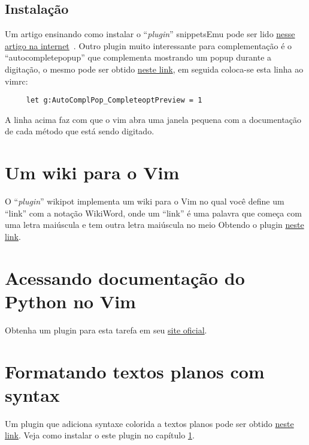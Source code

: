 \subsection{Instalação}
\label{Instalação}

Um artigo ensinando como instalar o ``{\em plugin}'' snippetsEmu pode ser lido 
\href{http://vivaotux.blogspot.com/2008/03/instalando-o-plugin-snippetsemu-no-vim.html}{nesse artigo na internet}~\cite{SilvasnipptsEmu}.
Outro plugin muito interessante para complementação é o ``autocompletepopup'' que complementa 
mostrando um popup durante a digitação, o mesmo pode ser obtido 
\href{http://www.vim.org/scripts/script.php?script\_id=1879}{neste link}, em seguida coloca-se esta 
linha ao vimrc:

\begin{verbatim}
     let g:AutoComplPop_CompleteoptPreview = 1
\end{verbatim}

A linha acima faz com que o vim abra uma janela pequena com a documentação
de cada método que está sendo digitado.

\section{Um wiki para o Vim}\label{sec:Um wiki para o Vim}
O ``{\em plugin}'' wikipot implementa um wiki para o Vim no qual você define
um ``link'' com a notação WikiWord, onde um ``link'' é uma palavra que
começa com uma letra maiúscula e tem outra letra maiúscula no meio
Obtendo o plugin  \href{http://www.vim.org/scripts/script.php?script\_id=1018}{neste link}.

\section{Acessando documentação do Python no Vim}\label{Acessando documentação do Python no Vim}
 Obtenha um plugin para esta tarefa em seu 
 \href{http://www.vim.org/scripts/script.php?script\_id=910}{site oficial}.

\section{Formatando textos planos com syntax}\label{Formatando textos planos com syntax}
Um plugin que adiciona syntaxe colorida a textos planos pode ser obtido
\href{http://www.vim.org/scripts/script.php?script\_id=2208&rating=helpful#1.3}{neste link}.
Veja como instalar o este plugin no capítulo \ref{sec:Um wiki para o Vim}.

